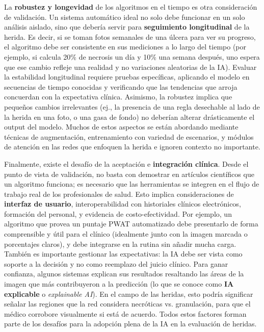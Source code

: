 La \textbf{robustez y longevidad} de los algoritmos en el tiempo es otra consideración de validación. Un sistema automático ideal no solo debe funcionar en un solo análisis aislado, sino que debería servir para \textbf{seguimiento longitudinal} de la herida. Es decir, si se toman fotos semanales de una úlcera para ver su progreso, el algoritmo debe ser consistente en sus mediciones a lo largo del tiempo (por ejemplo, si calcula 20\% de necrosis un día y 10\% una semana después, uno espera que ese cambio refleje una realidad y no variaciones aleatorias de la IA). Evaluar la estabilidad longitudinal requiere pruebas específicas, aplicando el modelo en secuencias de tiempo conocidas y verificando que las tendencias que arroja concuerdan con la expectativa clínica. Asimismo, la robustez implica que pequeños cambios irrelevantes (ej., la presencia de una regla desechable al lado de la herida en una foto, o una gasa de fondo) no deberían alterar drásticamente el output del modelo. Muchos de estos aspectos se están abordando mediante técnicas de augmentación, entrenamiento con variedad de escenarios, y módulos de atención en las redes que enfoquen la herida e ignoren contexto no importante. 

Finalmente, existe el desafío de la aceptación e \textbf{integración clínica}. Desde el punto de vista de validación, no basta con demostrar en artículos científicos que un algoritmo funciona; es necesario que las herramientas se integren en el flujo de trabajo real de los profesionales de salud. Esto implica consideraciones de \textbf{interfaz de usuario}, interoperabilidad con historiales clínicos electrónicos, formación del personal, y evidencia de costo-efectividad. Por ejemplo, un algoritmo que provea un puntaje PWAT automatizado debe presentarlo de forma comprensible y útil para el clínico (idealmente junto con la imagen marcada o porcentajes claros), y debe integrarse en la rutina sin añadir mucha carga. También es importante gestionar las expectativas: la IA debe ser vista como soporte a la decisión y no como reemplazo del juicio clínico. Para ganar confianza, algunos sistemas explican sus resultados resaltando las áreas de la imagen que más contribuyeron a la predicción (lo que se conoce como \textbf{IA explicable} o \textit{explainable AI}). En el campo de las heridas, esto podría significar señalar las regiones que la red considera necróticas vs. granulación, para que el médico corrobore visualmente si está de acuerdo. Todos estos factores forman parte de los desafíos para la adopción plena de la IA en la evaluación de heridas.




